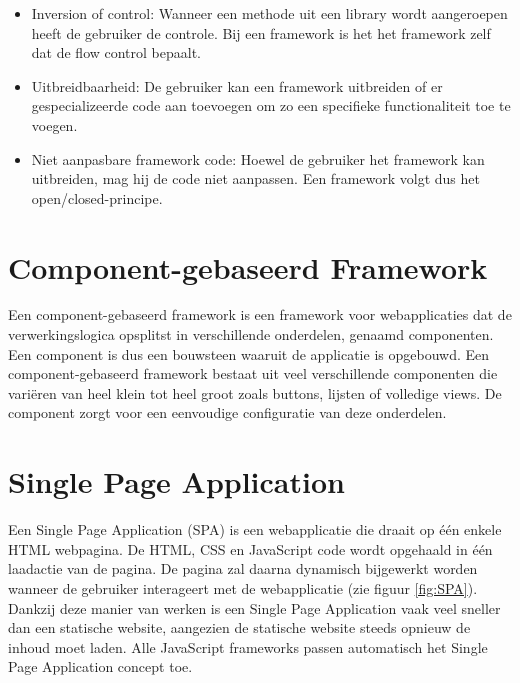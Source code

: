 \begin{itemize}
	\item Inversion of control: Wanneer een methode uit een library wordt aangeroepen heeft de gebruiker de controle. Bij een framework is het het framework zelf dat de flow control bepaalt. 
	\item Uitbreidbaarheid: De gebruiker kan een framework uitbreiden of er gespecializeerde code aan toevoegen om zo een specifieke functionaliteit toe te voegen. 
	\item Niet aanpasbare framework code: Hoewel de gebruiker het framework kan uitbreiden, mag hij de code niet aanpassen. Een framework volgt dus het open/closed-principe. 
	
\end{itemize}


\section{Component-gebaseerd Framework}
Een component-gebaseerd framework is een framework voor webapplicaties dat de verwerkingslogica opsplitst in verschillende onderdelen, genaamd componenten. 
Een component is dus een bouwsteen waaruit de applicatie is opgebouwd. Een component-gebaseerd framework bestaat uit veel verschillende componenten die variëren van heel klein tot heel groot zoals buttons, lijsten of volledige views. De component zorgt voor een eenvoudige configuratie van deze onderdelen. 


\section{Single Page Application}
Een Single Page Application (SPA) is een webapplicatie die draait op één enkele HTML webpagina. De HTML, CSS en JavaScript code wordt opgehaald in één laadactie van de pagina. De pagina zal daarna dynamisch bijgewerkt worden wanneer de gebruiker interageert met de webapplicatie (zie figuur \ref{fig:SPA}). Dankzij deze manier van werken is een Single Page Application vaak veel sneller dan een statische website, aangezien de statische website steeds opnieuw de inhoud moet laden. Alle JavaScript frameworks passen automatisch het Single Page Application concept toe. 

